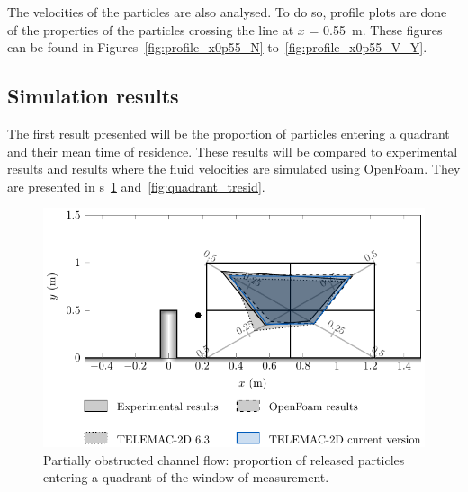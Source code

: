 The velocities of the particles are also analysed.
To do so, profile plots are done of the properties of the particles crossing
the line at $x$ = 0.55~m.
These figures can be found in Figures~\ref{fig:profile_x0p55_N}
to~\ref{fig:profile_x0p55_V_Y}.

\subsection{Simulation results}

The first result presented will be the proportion of particles entering a
quadrant and their mean time of residence.
These results will be compared to experimental results and results where the
fluid velocities are simulated using OpenFoam.
They are presented in
\figurename{}s~\ref{fig:quadrant_npart} and~\ref{fig:quadrant_tresid}.

\begin{figure}[H]
\begin{center}
  \includegraphics[]{./img/CanalAlgQuadrantNpart}
\end{center}
\caption{Partially obstructed channel flow: proportion of released particles entering a quadrant of the window of measurement.}
\label{fig:quadrant_npart}
\end{figure}

